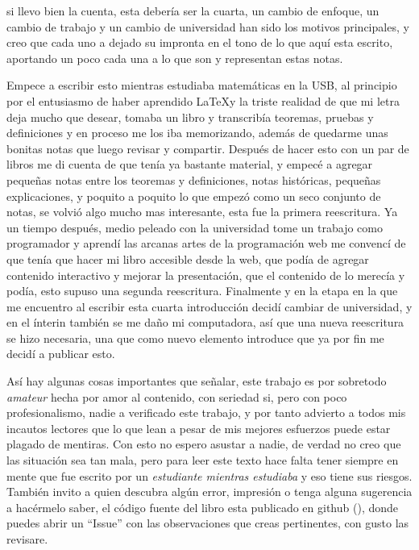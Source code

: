 \noindent {}
si llevo bien la cuenta, esta debería ser la cuarta, un cambio de enfoque, 
un cambio de trabajo y un cambio de universidad han sido los motivos
principales, y creo que cada uno a dejado su impronta en el tono de lo que aquí
esta escrito, aportando un poco cada una a lo que son y representan estas notas.

Empece a escribir esto mientras estudiaba matemáticas en la USB, al principio
por el entusiasmo de haber aprendido \LaTeX y la triste realidad de que mi letra
deja mucho que desear, tomaba un libro y transcribía teoremas, pruebas y
definiciones y en proceso me los iba memorizando, además de quedarme unas
bonitas notas que luego revisar y compartir. Después de hacer esto con un par de
libros me di cuenta de que tenía ya bastante material, y empecé a agregar
pequeñas notas entre los teoremas y definiciones, notas históricas, pequeñas
explicaciones, y poquito a poquito lo que empezó como un seco conjunto de
notas, se volvió algo mucho mas interesante, esta fue la primera reescritura. Ya
un tiempo después, medio peleado con la universidad tome un trabajo como
programador y aprendí las arcanas artes de la programación web me convencí de
que tenía que hacer mi libro accesible desde la web, que podía de agregar
contenido interactivo y mejorar la presentación, que el contenido de lo merecía
y podía, esto supuso una segunda reescritura. Finalmente y en la etapa en la que
me encuentro al escribir esta cuarta introducción decidí cambiar de universidad,
y en el ínterin también se me daño mi computadora, así que una nueva reescritura
se hizo necesaria, una que como nuevo elemento introduce que ya por fin me
decidí a publicar esto.

Así hay algunas cosas importantes que señalar, este trabajo es por sobretodo
\emph{amateur} hecha por amor al contenido, con seriedad si, pero con poco
profesionalismo, nadie a verificado este trabajo, y por tanto advierto a todos
mis incautos lectores que lo que lean a pesar de mis mejores esfuerzos puede
estar plagado de mentiras. Con esto no espero asustar a nadie, de verdad no creo
que las situación sea tan mala, pero para leer este texto hace falta tener
siempre en mente que fue escrito por un \emph{estudiante mientras estudiaba} y
eso tiene sus riesgos. También invito a quien descubra algún error, impresión
o tenga alguna sugerencia a hacérmelo saber, el código fuente del libro esta
publicado en github (), donde puedes abrir un ``Issue''  con las observaciones
que creas pertinentes, con gusto las revisare.

